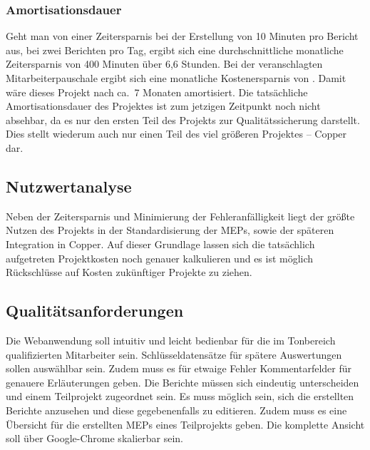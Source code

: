 
\subsubsection{Amortisationsdauer}
\label{sec:Amortisationsdauer}
Geht man von einer Zeitersparnis bei der Erstellung von 10 Minuten pro Bericht aus, bei zwei Berichten pro Tag, ergibt sich eine durchschnittliche monatliche Zeitersparnis von 400 Minuten über 6,6 Stunden. Bei der veranschlagten Mitarbeiterpauschale ergibt sich eine monatliche Kostenersparnis von . Damit wäre dieses Projekt nach ca.\ 7 Monaten amortisiert.
Die tatsächliche Amortisationsdauer des Projektes ist zum jetzigen Zeitpunkt noch nicht absehbar, da es nur den ersten Teil des Projekts zur Qualitätssicherung darstellt. Dies stellt wiederum auch nur einen Teil des viel größeren Projektes – Copper dar.

\subsection{Nutzwertanalyse}
\label{sec:Nutzwertanalyse}
Neben der Zeitersparnis und Minimierung der Fehleranfälligkeit liegt der größte Nutzen des Projekts in der Standardisierung der \ac{MEP}s, sowie der späteren Integration in Copper. Auf dieser Grundlage lassen sich die tatsächlich aufgetreten Projektkosten noch genauer kalkulieren und es ist möglich Rückschlüsse auf Kosten zukünftiger Projekte zu ziehen.


\subsection{Qualitätsanforderungen}
\label{sec:Qualitaetsanforderungen}
Die Webanwendung soll intuitiv und leicht bedienbar für die im Tonbereich qualifizierten Mitarbeiter sein. Schlüsseldatensätze für spätere Auswertungen sollen auswählbar sein. Zudem muss es für etwaige Fehler Kommentarfelder für genauere Erläuterungen geben. Die Berichte müssen sich eindeutig unterscheiden und einem Teilprojekt zugeordnet sein. Es muss möglich sein, sich die erstellten Berichte anzusehen und diese gegebenenfalls zu editieren. Zudem muss es eine Übersicht für die erstellten \ac{MEP}s eines Teilprojekts geben. Die komplette Ansicht soll über Google-Chrome skalierbar sein.

